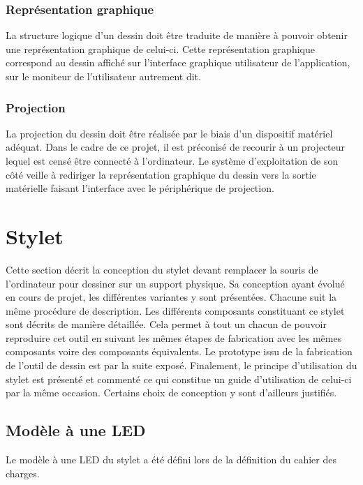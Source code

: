 \documentclass[11pt,a4paper,oldfontcommands]{memoir}
\begin{document}
\subsubsection{Représentation graphique}

La structure logique d'un dessin doit être traduite de manière à pouvoir obtenir une représentation graphique de celui-ci. Cette représentation graphique correspond au dessin affiché sur l'interface graphique utilisateur de l'application, sur le moniteur de l'utilisateur autrement dit.

\subsubsection{Projection}

La projection du dessin doit être réalisée par le biais d'un dispositif matériel adéquat. Dans le cadre de ce projet, il est préconisé de recourir à un projecteur lequel est censé être connecté à l'ordinateur. Le système d'exploitation de son côté veille à rediriger la représentation graphique du dessin vers la sortie matérielle faisant l'interface avec le périphérique de projection.

\newpage

\section{Stylet}

Cette section décrit la conception du stylet devant remplacer la souris de l'ordinateur pour dessiner sur un support physique. Sa conception ayant évolué en cours de projet, les différentes variantes y sont présentées. Chacune suit la même procédure de description. Les différents composants constituant ce stylet sont décrits de manière détaillée. Cela permet à tout un chacun de pouvoir reproduire cet outil en suivant les mêmes étapes de fabrication avec les mêmes composants voire des composants équivalents. Le prototype issu de la fabrication de l'outil de dessin est par la suite exposé. Finalement, le principe d'utilisation du stylet est présenté et commenté ce qui constitue un guide d'utilisation de celui-ci par la même occasion. Certains choix de conception y sont d'ailleurs justifiés.

\subsection{Modèle à une LED}

Le modèle à une LED du stylet a été défini lors de la définition du cahier des charges.
\end{document}
